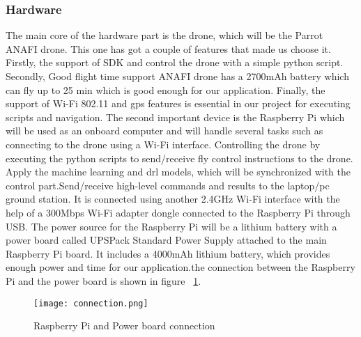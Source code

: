 \documentclass[../main.tex]{subfiles}
\begin{document}
\subsubsection{Hardware}
The main core of the hardware part is the drone, which will be the Parrot ANAFI drone. This one has got a couple of features that made us choose it. Firstly, the support of SDK and control the drone with a simple python script. Secondly, Good flight time support ANAFI drone has a 2700mAh battery which can fly up to 25 min which is good enough for our application. Finally, the support of Wi-Fi 802.11 and \gls{gps} features is essential in our project for executing scripts and navigation. The second important device is the Raspberry Pi which will be used as an onboard computer and will handle several tasks such as connecting to the drone using a Wi-Fi interface. Controlling the drone by executing the python scripts to send/receive fly control instructions to the drone. Apply the machine learning and \gls{drl} models, which will be synchronized with the control part.Send/receive high-level commands and results to the laptop/pc ground station. It is connected using another 2.4GHz Wi-Fi interface with the help of a 300Mbps Wi-Fi adapter dongle connected to the Raspberry Pi through USB. The power source for the Raspberry Pi will be a lithium battery with a power board called UPSPack Standard Power Supply attached to the main Raspberry Pi board. It includes a 4000mAh lithium battery, which provides enough power and time for our application.the connection between the Raspberry Pi and the power board is shown in figure ~\ref{Fig3:connection}.
\begin{figure}[H]
	\centering
	\texttt{[image: connection.png]}
	\caption{Raspberry Pi and Power board connection}\label{Fig3:connection}
\end{figure}     
\end{document}
